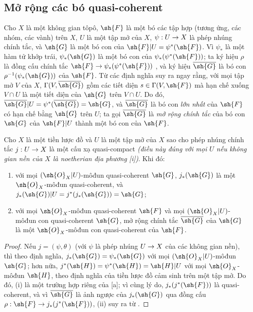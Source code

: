 \documentclass[oneside]{amsart}
\makeatletter
\newcommand{\ega@arrow}[2]{\mathchoice{#1}{#2}{#2}{#2}}
\renewcommand{\to}{\ega@arrow{\longrightarrow}{\rightarrow}}
\newcommand{\oldpage}[2][]{{\marginnote{\normalfont\textbf{#1}~|~#2}}\ignorespaces}
\let\EGAOriginalLabel\label
\renewcommand{\label}[1]{\phantomsection\EGAOriginalLabel{#1}}
\makeatother
\begin{document}
\oldpage[I]{174}
\subsection{Mở rộng các bó quasi-coherent}
\label{subsection:I.9.4}

\begin{env}[9.4.1]
\label{I.9.4.1}
Cho $X$ là một không gian tôpô, $\sh{F}$ là một bó các tập hợp (tương ứng, các nhóm, các
vành) trên $X$, $U$ là một tập mở của $X$, $\psi:U\to X$ là phép nhúng chính tắc, và
$\sh{G}$ là một bó con của $\sh{F}|U=\psi^*(\sh{F})$. Vì $\psi_*$ là một hàm tử khớp
trái, $\psi_*(\sh{G})$ là một bó con của $\psi_*(\psi^*(\sh{F}))$; ta ký hiệu $\rho$ là
đồng cấu chính tắc $\sh{F}\to\psi_*(\psi^*(\sh{F}))$ , và ký hiệu
$\overline{\sh{G}}$ là bó con $\rho^{-1}(\psi_*(\sh{G}))$ của $\sh{F}$. Từ các định nghĩa
suy ra ngay rằng, với mọi tập mở $V$ của $X$, $\Gamma(V,\overline{\sh{G}})$ gồm các tiết
diện $s\in\Gamma(V,\sh{F})$ mà hạn chế xuống $V\cap U$ là một tiết diện của $\sh{G}$ trên
$V\cap U$. Do đó, $\overline{\sh{G}}|U=\psi^*(\overline{\sh{G}})=\sh{G}$, và
$\overline{\sh{G}}$ là bó con \emph{lớn nhất} của $\sh{F}$ có hạn chế bằng $\sh{G}$ trên
$U$; ta gọi $\overline{\sh{G}}$ là \emph{mở rộng chính tắc} của bó con $\sh{G}$ của
$\sh{F}|U$ thành một bó con của $\sh{F}$.
\end{env}

\begin{proposition}[9.4.2]
\label{I.9.4.2}
Cho $X$ là một tiền lược đồ và $U$ là một tập mở của $X$ sao cho phép nhúng chính tắc
$j:U\to X$ là một cấu xạ quasi-compact \emph{(điều này đúng với \emph{mọi} $U$ nếu
không gian nền của $X$ là \emph{noetherian địa phương}
[i])}. Khi đó:
\begin{enumerate}
  \item[{\rm(i)}] với mọi $(\sh{O}_X|U)$-môđun quasi-coherent $\sh{G}$, $j_*(\sh{G})$
    là một $\sh{O}_X$-môđun quasi-coherent, và
    $j_*(\sh{G})|U=j^*(j_*(\sh{G}))=\sh{G}$;
  \item[{\rm(ii)}] với mọi $\sh{O}_X$-môđun quasi-coherent $\sh{F}$ và mọi
    $(\sh{O}_X|U)$-môđun con quasi-coherent $\sh{G}$, mở rộng chính tắc
    $\overline{\sh{G}}$ của $\sh{G}$  là một
    $\sh{O}_X$-môđun con quasi-coherent của $\sh{F}$.
\end{enumerate}
\end{proposition}

\begin{proof}
Nếu $j=(\psi,\theta)$ (với $\psi$ là phép nhúng $U\to X$ của các không gian nền), thì
theo định nghĩa, $j_*(\sh{G})=\psi_*(\sh{G})$ với mọi
$(\sh{O}_X|U)$-môđun $\sh{G}$; hơn nữa,
$j^*(\sh{H})=\psi^*(\sh{H})=\sh{H}|U$ với mọi $\sh{O}_X$-môđun $\sh{H}$, theo định
nghĩa của tiền lược đồ cảm sinh trên một tập mở. Do đó, (i) là một trường hợp riêng
của [a]; vì cùng lý do, $j_*(j^*(\sh{F}))$ là quasi-coherent, và vì
$\overline{\sh{G}}$ là ảnh ngược của $j_*(\sh{G})$ qua đồng cấu
$\rho:\sh{F}\to j_*(j^*(\sh{F}))$, (ii) suy ra từ .
\end{proof}
\end{document}
